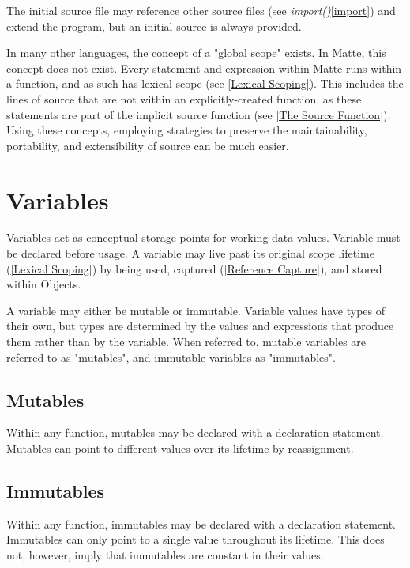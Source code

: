 \documentclass[12pt,letterpaper]{report}
\begin{document}
The initial source file may reference other source files (see \textit{import()}\autoref{import}) 
and extend the program, but an initial source is always provided.

In many other languages, the concept of a "global scope" exists. In Matte, 
this concept does not exist. Every statement and expression within Matte 
runs within a function, and as such has lexical scope (see \autoref{Lexical Scoping}).
This includes the lines of source that are not within an explicitly-created
function, as these statements are part of the implicit source function 
(see \autoref{The Source Function}). Using these concepts, employing strategies 
to preserve the maintainability, portability, and extensibility of source can 
be much easier.





\chapter{Variables}\label{Variables}

Variables act as conceptual storage points for working data values. Variable must be declared before usage.
A variable may live past its original scope lifetime (\autoref{Lexical Scoping}) by being used, captured (\autoref{Reference Capture}), and stored within Objects.

A variable may either be mutable or immutable. Variable values have types of their own, but 
types are determined by the values and expressions that produce them rather than by the 
variable. When referred to, mutable variables are referred to as "mutables", and immutable variables as "immutables".

\section{Mutables}\label{Mutables}

Within any function, mutables may be declared with a declaration statement.
Mutables can point to different values over its lifetime by reassignment.
    




\section{Immutables}\label{Immutables}
Within any function, immutables may be declared with a declaration statement.
Immutables can only point to a single value throughout its lifetime. This does not, however,
imply that immutables are constant in their values. 
\end{document}
